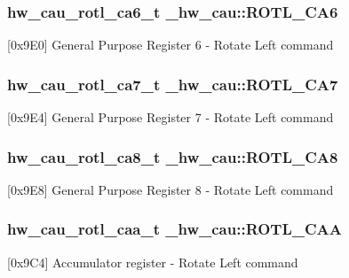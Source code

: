\subsubsection[{\texorpdfstring{R\+O\+T\+L\+\_\+\+C\+A6}{ROTL_CA6}}]{ {\bf hw\+\_\+cau\+\_\+rotl\+\_\+ca6\+\_\+t} \+\_\+hw\+\_\+cau\+::\+R\+O\+T\+L\+\_\+\+C\+A6}\hypertarget{struct__hw__cau_ac66f2106f07c30d55377c920b932d5b6}{}\label{struct__hw__cau_ac66f2106f07c30d55377c920b932d5b6}
\mbox{[}0x9\+E0\mbox{]} General Purpose Register 6 -\/ Rotate Left command 
\subsubsection[{\texorpdfstring{R\+O\+T\+L\+\_\+\+C\+A7}{ROTL_CA7}}]{ {\bf hw\+\_\+cau\+\_\+rotl\+\_\+ca7\+\_\+t} \+\_\+hw\+\_\+cau\+::\+R\+O\+T\+L\+\_\+\+C\+A7}\hypertarget{struct__hw__cau_abe3b613e7de4bd1e680838535581da29}{}\label{struct__hw__cau_abe3b613e7de4bd1e680838535581da29}
\mbox{[}0x9\+E4\mbox{]} General Purpose Register 7 -\/ Rotate Left command 
\subsubsection[{\texorpdfstring{R\+O\+T\+L\+\_\+\+C\+A8}{ROTL_CA8}}]{ {\bf hw\+\_\+cau\+\_\+rotl\+\_\+ca8\+\_\+t} \+\_\+hw\+\_\+cau\+::\+R\+O\+T\+L\+\_\+\+C\+A8}\hypertarget{struct__hw__cau_a1aece1c897eb57c01ba363191da5609a}{}\label{struct__hw__cau_a1aece1c897eb57c01ba363191da5609a}
\mbox{[}0x9\+E8\mbox{]} General Purpose Register 8 -\/ Rotate Left command 
\subsubsection[{\texorpdfstring{R\+O\+T\+L\+\_\+\+C\+AA}{ROTL_CAA}}]{ {\bf hw\+\_\+cau\+\_\+rotl\+\_\+caa\+\_\+t} \+\_\+hw\+\_\+cau\+::\+R\+O\+T\+L\+\_\+\+C\+AA}\hypertarget{struct__hw__cau_a401a2a7c1bdcc1e60960605835947777}{}\label{struct__hw__cau_a401a2a7c1bdcc1e60960605835947777}
\mbox{[}0x9\+C4\mbox{]} Accumulator register -\/ Rotate Left command 
